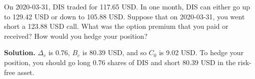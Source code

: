 \noindent On 2020-03-31, DIS traded for 117.65 USD. In one month, DIS can either go up to 129.42 USD or down to 105.88 USD. Suppose that on 2020-03-31, you went short a 123.88 USD call. What was the option premium that you paid or received? How would you hedge your position?

\vspace{9pt}

\noindent\textbf{Solution.} $\Delta_{c}$ is 0.76, $B_{c}$ is 80.39 USD, and so $C_{0}$ is 9.02 USD. To hedge your position, you should go long 0.76 shares of DIS and short 80.39 USD in the risk-free asset.